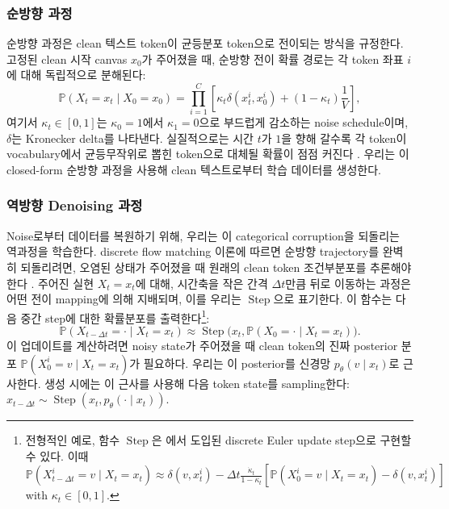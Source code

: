 \documentclass[11pt, a4paper, logo, copyright, gdm]{google}
\newcommand{\step}{\operatorname{Step}}
\begin{document}
\subsubsection{순방향 과정}
순방향 과정은 clean 텍스트 token이 균등분포 token으로 전이되는 방식을 규정한다. 고정된 clean 시작 canvas $x_0$가 주어졌을 때, 순방향 전이 확률 경로는 각 token 좌표 $i$에 대해 독립적으로 분해된다:
\begin{equation}\label{eq:factorized_path_pmf}
    \mathbb{P}(X_t=x_t \mid X_0 = x_0) =
    \prod_{i=1}^C \left[ \kappa_t \delta(x_t^i, x_0^i) + (1 - \kappa_t) \frac{1}{V} \right],
\end{equation}
여기서 $\kappa_t \in [0,1]$는 $\kappa_0 = 1$에서 $\kappa_1 = 0$으로 부드럽게 감소하는 noise schedule이며, $\delta$는 Kronecker delta를 나타낸다. 실질적으로는 시간 $t$가 $1$을 향해 갈수록 각 token이 vocabulary에서 균등무작위로 뽑힌 token으로 대체될 확률이 점점 커진다 \citep{hoogeboom2021argmax, austin2021structured}. 우리는 이 closed-form 순방향 과정을 사용해 clean 텍스트로부터 학습 데이터를 생성한다.

\subsubsection{역방향 Denoising 과정}
Noise로부터 데이터를 복원하기 위해, 우리는 이 categorical corruption을 되돌리는 역과정을 학습한다. discrete flow matching 이론에 따르면 순방향 trajectory를 완벽히 되돌리려면, 오염된 상태가 주어졌을 때 원래의 clean token 조건부분포를 추론해야 한다 \citep{campbell2024generative, gat2024discrete, ou2025absorbing}. 주어진 실현 $X_t = x_t$에 대해, 시간축을 작은 간격 $\Delta t$만큼 뒤로 이동하는 과정은 어떤 전이 mapping에 의해 지배되며, 이를 우리는 $\step$으로 표기한다. 이 함수는 다음 중간 step에 대한 확률분포를 출력한다\footnote{전형적인 예로, 함수 $\step$은 \citet{gat2024discrete}에서 도입된 discrete Euler update step으로 구현할 수 있다. 이때 $
\mathbb{P}(X_{t-\Delta t}^i = v \mid X_t = x_t) \approx \delta(v, x_t^i) - \Delta t \frac{\dot{\kappa}_t}{1 - \kappa_t} \left[ \mathbb{P}(X_0^i = v \mid X_t = x_t) - \delta(v, x_t^i) \right]$ with $\kappa_t \in [0, 1]$.}:
\begin{equation}\label{eq:transition-mapping}
\mathbb{P}(X_{t-\Delta t} = \cdot \mid X_t = x_t) \approx \operatorname{Step}\Big(x_t, \mathbb{P}(X_{0} = \cdot \mid X_t = x_t)\Big).
\end{equation}
이 업데이트를 계산하려면 noisy state가 주어졌을 때 clean token의 진짜 posterior 분포 $\mathbb{P}(X_{0}^i = v \mid X_t = x_t)$가 필요하다. 우리는 이 posterior를 신경망 $p_\theta(v \mid x_t)$로 근사한다. 생성 시에는 이 근사를 사용해 다음 token state를 sampling한다: $x_{t-\Delta t} \sim \operatorname{Step}(x_t, p_\theta(\cdot \mid x_t))$.
\end{document}
